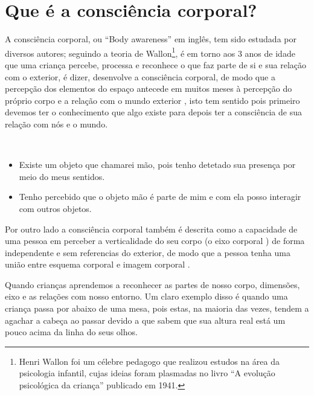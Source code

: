 \section{Que é a consciência corporal?}
\label{sec:BodyAwareness}
A consciência corporal, ou  ``Body awareness'' em inglês, 
tem sido estudada por diversos autores;
seguindo a teoria de Wallon\footnote{Henri Wallon 
foi um célebre pedagogo que realizou estudos na área da psicologia infantil, 
cujas ideias foram plasmadas no livro ``A evolução psicológica da criança'' publicado em 1941.}, 
é em torno aos 3 anos de idade que uma criança percebe, processa e reconhece
o que faz parte de si e sua relação com o exterior, é dizer, desenvolve a consciência corporal,
de modo que a percepção dos elementos do espaço antecede em muitos meses à 
percepção do próprio corpo e a relação com o mundo exterior
\cite{Garanhani2015} \cite{bueno2016psicomotricidade} \cite[pp. 154, 220]{wallon1968evoluccao}
\cite[pp. 14]{bolio2006fantasia},
isto tem sentido pois primeiro devemos ter o conhecimento que algo existe para 
depois ter a consciência de sua relação com nós e o mundo.
\begin{example}~

\begin{itemize}
\item Existe um objeto que chamarei mão, pois tenho detetado sua presença por meio do meus sentidos.
\item Tenho percebido que o objeto mão é parte de mim e com ela posso interagir com outros 
objetos. 
\end{itemize}
\end{example}
Por outro lado a consciência corporal também é descrita como a 
capacidade de uma pessoa em perceber a verticalidade do seu corpo 
(o eixo corporal \cite{bueno2016psicomotricidade}) de forma independente e 
sem referencias do exterior, 
de modo que a pessoa tenha uma união entre esquema corporal e imagem corporal \cite[pp. 14]{balcells2002expresion}.
\begin{example}
Quando crianças aprendemos a reconhecer as partes de nosso corpo, dimensões, eixo e as relações com nosso entorno.
Um claro exemplo disso é quando uma criança passa por abaixo de uma mesa, 
pois estas, na maioria das vezes, tendem a agachar a cabeça ao passar 
devido a que sabem que sua altura real está 
um pouco acima da linha do seus olhos.
\end{example}

